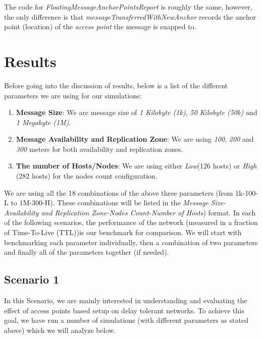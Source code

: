 The code for \textit{FloatingMessageAnchorPointsReport} is roughly the same, however, the only difference is that \textit{messageTransferredWithNewAnchor} records the anchor point (location) of the \textit{access point} the message is snapped to.


\section{Results}
Before going into the discussion of results, below is a list of the different parameters we are using for our simulations:
\begin{enumerate}
  \item \textbf{Message Size}: We are message size of \textit{1 Kilobyte (1k)}, \textit{50 Kilobyte (50k)} and \textit{1 Megabyte (1M)}.
  \item \textbf{Message Availability and Replication Zone}: We are using \textit{100}, \textit{200} and \textit{300} meters for both availability and replication zones.
  \item \textbf{The number of Hosts/Nodes}: We are using either \textit{Low}(126 hosts) or \textit{High} (282 hosts) for the nodes count configuration.
\end{enumerate}

We are using all the 18 combinations of the above three parameters (from 1k-100-L to 1M-300-H). These combinations will be listed in the \textit{Message Size-Availability and Replication Zone-Nodes Count-Number of Hosts}) format.\newline\newline
In each of the following scenarios, the performance of the network (measured in a fraction of Time-To-Live (TTL))is our benchmark for comparison. We will start with benchmarking each parameter individually, then a combination of two parameters and finally all of the parameters together (if needed).
\subsection{Scenario 1}
In this Scenario, we are mainly interested in understanding and evaluating the effect of access points based setup on delay tolerant networks. To achieve this goal, we have run a number of simulations (with different parameters as stated above) which we will analyze below.
